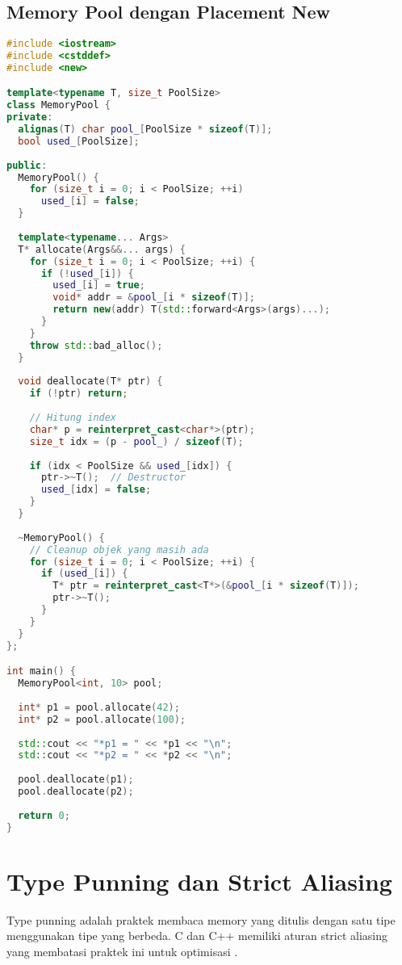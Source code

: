 \documentclass[../main.tex]{subfiles}
\begin{document}
\subsection{Memory Pool dengan Placement New}
\begin{lstlisting}[language=C++, caption={Simple memory pool}]
#include <iostream>
#include <cstddef>
#include <new>

template<typename T, size_t PoolSize>
class MemoryPool {
private:
  alignas(T) char pool_[PoolSize * sizeof(T)];
  bool used_[PoolSize];
  
public:
  MemoryPool() {
    for (size_t i = 0; i < PoolSize; ++i)
      used_[i] = false;
  }
  
  template<typename... Args>
  T* allocate(Args&&... args) {
    for (size_t i = 0; i < PoolSize; ++i) {
      if (!used_[i]) {
        used_[i] = true;
        void* addr = &pool_[i * sizeof(T)];
        return new(addr) T(std::forward<Args>(args)...);
      }
    }
    throw std::bad_alloc();
  }
  
  void deallocate(T* ptr) {
    if (!ptr) return;
    
    // Hitung index
    char* p = reinterpret_cast<char*>(ptr);
    size_t idx = (p - pool_) / sizeof(T);
    
    if (idx < PoolSize && used_[idx]) {
      ptr->~T();  // Destructor
      used_[idx] = false;
    }
  }
  
  ~MemoryPool() {
    // Cleanup objek yang masih ada
    for (size_t i = 0; i < PoolSize; ++i) {
      if (used_[i]) {
        T* ptr = reinterpret_cast<T*>(&pool_[i * sizeof(T)]);
        ptr->~T();
      }
    }
  }
};

int main() {
  MemoryPool<int, 10> pool;
  
  int* p1 = pool.allocate(42);
  int* p2 = pool.allocate(100);
  
  std::cout << "*p1 = " << *p1 << "\n";
  std::cout << "*p2 = " << *p2 << "\n";
  
  pool.deallocate(p1);
  pool.deallocate(p2);
  
  return 0;
}
\end{lstlisting}

\section{Type Punning dan Strict Aliasing}
Type punning adalah praktek membaca memory yang ditulis dengan satu tipe menggunakan tipe yang berbeda. C dan C++ memiliki aturan strict aliasing yang membatasi praktek ini untuk optimisasi \parencite{iso-c-draft-n1570,cpp-reference}.
\end{document}
